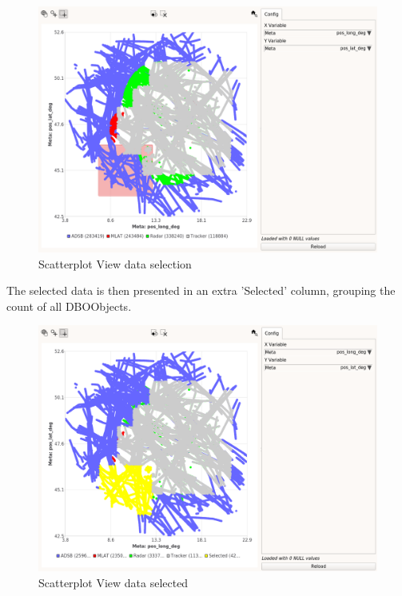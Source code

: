 \begin{figure}[H]
    \hspace*{-2cm}
    \includegraphics[width=18cm,frame]{../screenshots/scatter_select.png}
  \caption{Scatterplot View data selection}
\end{figure}

The selected data is then presented in an extra 'Selected' column, grouping the count of all DBOObjects.

\begin{figure}[H]
    \hspace*{-2cm}
    \includegraphics[width=18cm,frame]{../screenshots/scatter_selected.png}
  \caption{Scatterplot View data selected}
\end{figure}

